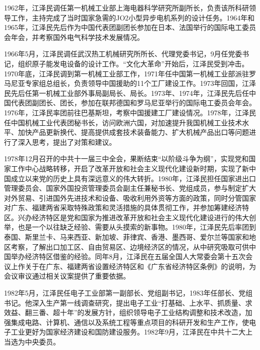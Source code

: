 \documentclass[UTF8, 11pt, oneside]{ctexart}
\begin{document}
1962年，江泽民调任第一机械工业部上海电器科学研究所副所长，负责该所科研领导工作，主持完成了当时国家急需的JO2小型异步电机系列的设计任务。1964年和1965年，江泽民先后作为中国代表团副团长参加在日本、法国举行的国际电工委员会年会，并考察国外电气科学技术发展情况。

1966年5月，江泽民调任武汉热工机械研究所所长、代理党委书记，9月任党委书记，组织原子能发电设备的设计工作。“文化大革命”开始后，江泽民受到冲击。1970年底，江泽民调到第一机械工业部工作，1971年任中国第一机械工业部派驻罗马尼亚专家组总组长，负责领导中国援助的11个工厂建设工作。1973年回国，江泽民先后任第一机械工业部外事局副局长、局长。1973年、1974年，江泽民先后任中国代表团副团长、团长，参加在联邦德国和罗马尼亚举行的国际电工委员会年会。1976年，江泽民率团前往巴基斯坦，考察中国援建工厂建设情况。1978年，江泽民任中国机械工业代表团秘书长，访问欧洲六国，对加速提升我国机械工业技术水平、加快产品更新换代、提高提供成套技术装备能力、扩大机械产品出口等问题进行了深入思考，提出了对策和建议。

1978年12月召开的中共十一届三中全会，果断结束“以阶级斗争为纲”，实现党和国家工作中心战略转移，开启了改革开放和社会主义现代化建设新时期，实现了新中国成立以来党的历史上具有深远意义的伟大转折。1980年，江泽民担任国家进出口管理委员会、国家外国投资管理委员会副主任兼秘书长、党组成员，参与制定扩大对外贸易、引进国外先进技术和设备、吸收利用外资等方面的政策，同时分管国家对广东、福建两省采取特殊政策和灵活措施的具体贯彻工作，并参加筹建经济特区。兴办经济特区是党和国家为推进改革开放和社会主义现代化建设进行的伟大创举，也是一个以往缺乏经验、需要从头摸索的新事物。1980年，江泽民先后率团到泰国、斯里兰卡、马来西亚、新加坡、菲律宾、香港、墨西哥、爱尔兰等国家和地区考察，了解出口加工区、自由贸易区、边境经济区的情况，从中研究吸取可供中国举办经济特区借鉴的经验。同年8月，江泽民在五届全国人大常委会第十五次会议上作关于在广东、福建两省设置经济特区和《广东省经济特区条例》的说明，为会议审议通过相关议案提供了重要依据。

1982年5月，江泽民任电子工业部第一副部长、党组副书记，1983年任部长、党组书记。他深入生产第一线调查研究，提出电子工业“打基础、上水平、抓质量、求效益、翻三番、超十年”的发展方针，组织领导电子工业结构调整和技术改造，加强集成电路、计算机、通信以及系统工程等重点项目的科研开发和生产工作，使电子工业更好为国家经济建设和国防建设服务。1982年9月，江泽民在中共十二大上当选为中央委员。
\end{document}

